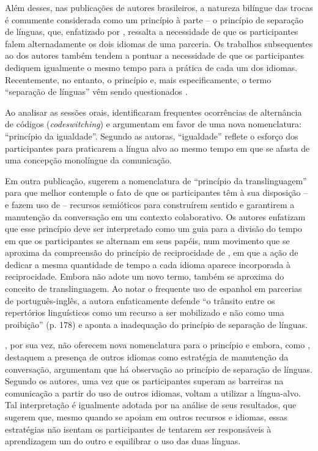 \documentclass[portuguese]{textolivre}
\begin{document}
Além desses, nas publicações de autores brasileiros, a natureza bilíngue das trocas é comumente considerada como um princípio à parte – o princípio de separação de línguas, que, enfatizado por \textcite{vassallo2006}, ressalta a necessidade de que os participantes falem alternadamente os dois idiomas de uma parceria. Os trabalhos subsequentes ao dos autores também tendem a pontuar a necessidade de que os participantes dediquem igualmente o mesmo tempo para a prática de cada um dos idiomas. Recentemente, no entanto, o princípio e, mais especificamente, o termo “separação de línguas” vêm sendo questionados \cite{lima-lopes2023, oliveira2024, picolietal2020, satar2023}.

Ao analisar as sessões orais, \textcite{picolietal2020} identificaram frequentes ocorrências de alternância de códigos (\textit{codeswitching}) e argumentam em favor de uma nova nomenclatura: “princípio da igualdade”. Segundo as autoras, “igualdade” reflete o esforço dos participantes para praticarem a língua alvo ao mesmo tempo em que se afasta de uma concepção monolíngue da comunicação.

Em outra publicação, \textcite{satar2023} sugerem a nomenclatura de “princípio da translinguagem” para que melhor contemple o fato de que os participantes têm à sua disposição -- e fazem uso de -- recursos semióticos para construírem sentido e garantirem a manutenção da conversação em um contexto colaborativo. Os autores enfatizam que esse princípio deve ser interpretado como um guia para a divisão do tempo em que os participantes se alternam em seus papéis, num movimento que se aproxima da compreensão do princípio de reciprocidade de \textcite{brammerts1996}, em que a ação de dedicar a mesma quantidade de tempo a cada idioma aparece incorporada à reciprocidade. Embora não adote um novo termo, \textcite{oliveira2024} também se aproxima do conceito de translinguagem. Ao notar o frequente uso de espanhol em parcerias de português-inglês, a autora enfaticamente defende “o trânsito entre os repertórios linguísticos como um recurso a ser mobilizado e não como uma proibição” (p. 178) e aponta a inadequação do princípio de separação de línguas.

\textcite{lima-lopes2023}, por sua vez, não oferecem nova nomenclatura para o princípio e embora, como \textcite{oliveira2024}, desta\-quem a presença de outros idiomas como estratégia de manutenção da conversação, argumentam que há observação ao princípio de separação de línguas. Segundo os autores, uma vez que os participantes superam as barreiras na comunicação a partir do uso de outros idiomas, voltam a utilizar a língua-alvo. Tal interpretação é igualmente adotada por \textcite{moore2023} na análise de seus resultados, que sugerem que, mesmo quando se apoiam em outros recursos e idiomas, essas estratégias não isentam os participantes de tentarem ser responsáveis à aprendizagem um do outro e equilibrar o uso das duas línguas.
\end{document}
